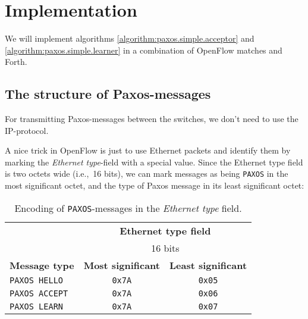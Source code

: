 \chapter{Implementation}
\label{chapter:implementation}
\label{implementation.simplified.paxos}

We will implement algorithms \ref{algorithm:paxos.simple.acceptor} 
and \ref{algorithm:paxos.simple.learner} in a combination of OpenFlow
matches and Forth.



\section{The structure of Paxos-messages}

For transmitting Paxos-messages between the switches, we don't need to use
the IP-protocol.

A nice trick in OpenFlow is just to use Ethernet packets
and identify them by marking the \textit{Ethernet
  type}-field with a special value.
Since the Ethernet type field is two octets wide (i.e.,~16 bits), we can
mark messages as being \texttt{PAXOS} in the most significant octet, and the
type of Paxos message in its least significant octet:

\begin{table}[H]
  \centering
  \begin{tabular}{l|c|c|}
    \cline{2-3}
      & \multicolumn{2}{c|}{\textbf{Ethernet type field}} \\
      & \multicolumn{2}{c|}{16 bits} \\

    \hline
      \multicolumn{1}{|l|}{\textbf{Message type}} &
      \textbf{Most significant} &
      \textbf{Least significant} \\

    \hline
      \multicolumn{1}{|l|}{\texttt{PAXOS HELLO}} &
      \texttt{0x7A} &
      \texttt{0x05} \\

    \hline
      \multicolumn{1}{|l|}{\texttt{PAXOS ACCEPT}} &
      \texttt{0x7A} &
      \texttt{0x06} \\

    \hline
      \multicolumn{1}{|l|}{\texttt{PAXOS LEARN}} &
      \texttt{0x7A} &
      \texttt{0x07} \\

    \hline
  \end{tabular}
  \caption{Encoding of \texttt{PAXOS}-messages in the \textit{Ethernet
    type} field.}
  \label{table:paxos.ethernet.type.encoding}
\end{table}

